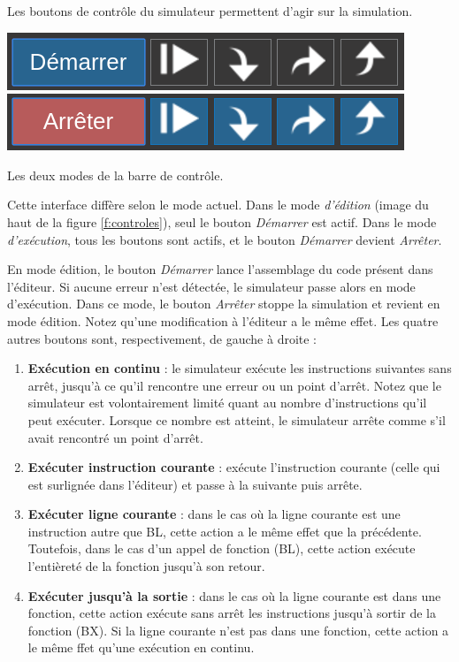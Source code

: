 \documentclass{tufte-handout}
\begin{document}
Les boutons de contrôle du simulateur permettent d'agir sur la simulation. 
\begin{marginfigure}
\includegraphics[width=\linewidth]{pics/controles_1.png}
\includegraphics[width=\linewidth]{pics/controles_2.png}
\label{f:controles}
\caption{Les deux modes de la barre de contrôle.}
\end{marginfigure}
Cette interface diffère selon le mode actuel. Dans le mode \emph{d'édition} (image du haut de la figure \ref{f:controles}), seul le bouton \textit{Démarrer} est actif. Dans le mode \emph{d'exécution}, tous les boutons sont actifs, et le bouton \textit{Démarrer} devient \textit{Arrêter}.

En mode édition, le bouton \textit{Démarrer} lance l'assemblage du code présent dans l'éditeur. Si aucune erreur n'est détectée, le simulateur passe alors en mode d'exécution. Dans ce mode, le bouton \textit{Arrêter} stoppe la simulation et revient en mode édition. Notez qu'une modification à l'éditeur a le même effet. Les quatre autres boutons sont, respectivement, de gauche à droite :
\begin{enumerate}
	\item \textbf{Exécution en continu} : le simulateur exécute les instructions suivantes sans arrêt, jusqu'à ce qu'il rencontre une erreur ou un point d'arrêt. Notez que le simulateur est volontairement limité quant au nombre d'instructions qu'il peut exécuter. Lorsque ce nombre est atteint, le simulateur arrête comme s'il avait rencontré un point d'arrêt.
	\item \textbf{Exécuter instruction courante} : exécute l'instruction courante (celle qui est surlignée dans l'éditeur) et passe à la suivante puis arrête.
	\item \textbf{Exécuter ligne courante} : dans le cas où la ligne courante est une instruction autre que BL, cette action a le même effet que la précédente. Toutefois, dans le cas d'un appel de fonction (BL), cette action exécute l'entièreté de la fonction jusqu'à son retour.
	\item \textbf{Exécuter jusqu'à la sortie} : dans le cas où la ligne courante est dans une fonction, cette action exécute sans arrêt les instructions jusqu'à sortir de la fonction (BX). Si la ligne courante n'est pas dans une fonction, cette action a le même ffet qu'une exécution en continu.
\end{enumerate}
\end{document}
